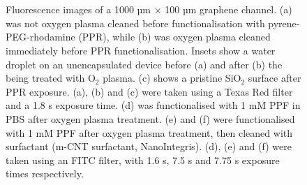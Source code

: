 \documentclass[
  a4paper,
]{scrbook}
\begin{document}
\begin{figure}
\begin{minipage}[t]{0.03\linewidth}
{{}

}

\end{minipage}%
%
\begin{minipage}[t]{0.01\linewidth}

{\centering 

~

}

\end{minipage}%
%
\begin{minipage}[t]{0.45\linewidth}

{\centering 


}

\end{minipage}%
%
\begin{minipage}[t]{0.01\linewidth}

{\centering 

~

}

\end{minipage}%

\caption{\label{fig-silicon-dioxide-interaction}Fluorescence images of a
1000 µm \(\times\) 100 µm graphene channel. (a) was not oxygen plasma
cleaned before functionalisation with pyrene-PEG-rhodamine (PPR), while
(b) was oxygen plasma cleaned immediately before PPR functionalisation.
Insets show a water droplet on an unencapsulated device before (a) and
after (b) the being treated with O\(_2\) plasma. (c) shows a pristine
SiO\(_2\) surface after PPR exposure. (a), (b) and (c) were taken using
a Texas Red filter and a 1.8 s exposure time. (d) was functionalised
with 1 mM PPF in PBS after oxygen plasma treatment. (e) and (f) were
functionalised with 1 mM PPF after oxygen plasma treatment, then cleaned
with surfactant (m-CNT surfactant, NanoIntegris). (d), (e) and (f) were
taken using an FITC filter, with 1.6 s, 7.5 s and 7.75 s exposure times
respectively.}

\end{figure}
\end{document}
